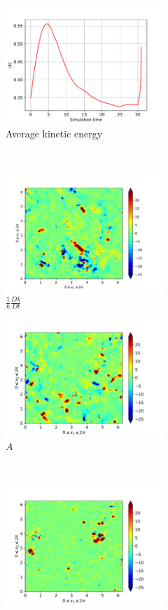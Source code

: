 \begin{figure}[H]
    \begin{subfigure}[H]{0.45\textwidth}
        \includegraphics[height=1.75in]{media/run-cds-65/ke-average1440}
        \caption{Average kinetic energy}
    \end{subfigure}
    ~
    \begin{subfigure}[H]{0.45\textwidth}
        \includegraphics[height=1.75in]{media/run-cds-65/ke-1440}
        \caption{$\frac{1}{k} \frac{D k}{Dt}$}
    \end{subfigure}
    \newline
    \begin{subfigure}{0.45\textwidth}
        \includegraphics[height=1.75in]{media/run-cds-65/A-ke-1440}
        \caption{$A$}
    \end{subfigure}
    ~
    \begin{subfigure}{0.45\textwidth}
        \includegraphics[height=1.75in]{media/run-cds-65/C-ke-1440}

\end{subfigure}
\end{figure}
